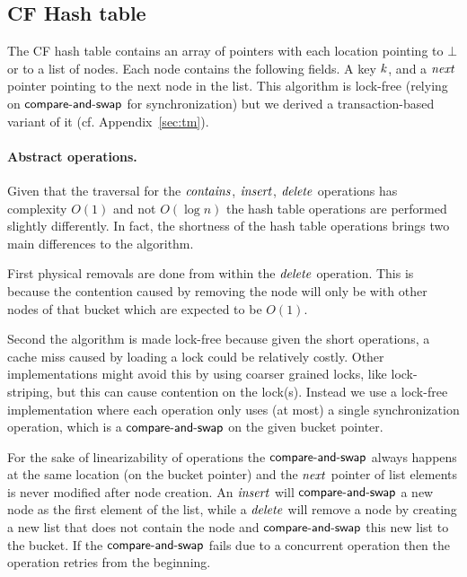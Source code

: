 
\subsection{CF Hash table}

The CF hash table contains an array of pointers with each location pointing to $\bot$ or to
a list of nodes. Each node contains the following fields.
A key $\ms{k}$, and a $\ms{next}$ pointer pointing to the next node in the list.
This algorithm is lock-free (relying on $\lit{compare-and-swap}$ for synchronization) but we derived a transaction-based variant of it (cf. Appendix~\ref{sec:tm}).

\paragraph{Abstract operations.}

Given that the traversal for the $\ms{contains}$, $\ms{insert}$, $\ms{delete}$ operations has complexity $O(1)$ and not $O(\log{n})$ the
hash table operations are performed slightly differently.
In fact, the shortness of the hash table operations brings two main differences to the algorithm.

First physical removals are done from within the $\ms{delete}$ operation.
This is because the contention caused by removing the node will only be with other nodes of that bucket which are expected to be
$O(1)$.

Second the algorithm is made lock-free because given the short operations, a cache miss caused 
by loading a lock could be relatively costly.
Other implementations might avoid this by using coarser grained locks, like lock-striping, but
this can cause contention on the lock(s).
Instead we use a lock-free implementation where each operation only uses (at most)
a single synchronization operation, which is a $\lit{compare-and-swap}$ on the given bucket pointer.

For the sake of linearizability of operations the $\lit{compare-and-swap}$ always happens
at the same location (on the bucket pointer) and the $\ms{next}$ pointer of list elements
is never modified after node creation.
An $\ms{insert}$ will $\lit{compare-and-swap}$ a new node as the first element of the list, while
a $\ms{delete}$ will remove a node by creating a new list that does not contain the node
and $\lit{compare-and-swap}$ this new list to the bucket.
If the $\lit{compare-and-swap}$ fails due to a concurrent operation
then the operation retries from the beginning.

